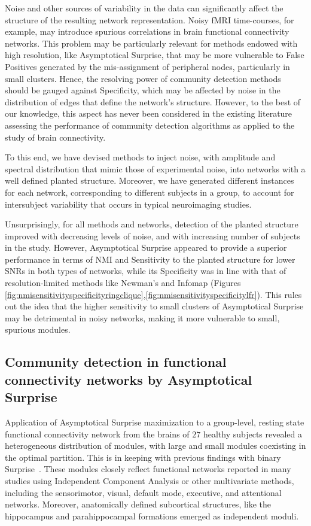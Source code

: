Noise and other sources of variability in the data can significantly affect the structure of the resulting network representation.
Noisy fMRI time-courses, for example, may introduce spurious correlations in brain functional connectivity networks.
This problem may be particularly relevant for methods endowed with high resolution, like Asymptotical Surprise, that may be more vulnerable to False Positives generated by the mis-assignment of peripheral nodes, particularly in small clusters. Hence, the resolving power of community detection methods should be gauged against Specificity, which may be affected by noise in the distribution of edges that define the network's structure.
However, to the best of our knowledge, this aspect has never been considered in the existing literature assessing the performance of community detection algorithms as applied to the study of brain connectivity.

To this end, we have devised methods to inject noise, with amplitude and spectral distribution that mimic those of experimental noise, into networks with a well defined planted structure. Moreover, we have generated different instances for each network, corresponding to different subjects in a group, to account for intersubject variability that occurs in typical neuroimaging studies. 

Unsurprisingly, for all methods and networks, detection of the planted structure improved with decreasing levels of noise, and with increasing number of subjects in the study.
However, Asymptotical Surprise appeared to provide a superior performance in terms of NMI and Sensitivity to the planted structure for lower SNRs in both types of networks, while its Specificity was in line with that of resolution-limited methods like Newman's and Infomap (Figures \ref{fig:nmisensitivityspecificityringclique},\ref{fig:nmisensitivityspecificitylfr}).
This rules out the idea that the higher sensitivity to small clusters of Asymptotical Surprise may be detrimental in noisy networks, making it more vulnerable to small, spurious modules.

\subsection{Community detection in functional connectivity networks by Asymptotical Surprise}

Application of Asymptotical Surprise maximization to a group-level, resting state functional connectivity network from the brains of $27$ healthy subjects revealed a heterogeneous distribution of modules, with large and small modules coexisting in the optimal partition.
This is in keeping with previous findings with binary Surprise~\cite{nicolini2016}.
These modules closely reflect functional networks reported in many studies using Independent Component Analysis or other multivariate methods, including the sensorimotor, visual, default mode, executive, and attentional networks.
Moreover, anatomically defined subcortical structures, like the hippocampus and parahippocampal formations emerged as independent moduli.


